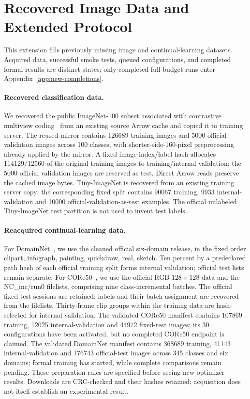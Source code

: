 \section{Recovered Image Data and Extended Protocol}
\label{app:recovered-images}
This extension fills previously missing image and continual-learning datasets. Acquired data, successful smoke tests, queued configurations, and completed formal results are distinct states; only completed full-budget runs enter Appendix~\ref{app:new-completions}.

\paragraph{Recovered classification data.}
We recovered the public ImageNet-100 subset associated with contrastive multiview coding~\cite{tian2020cmc} from an existing source Arrow cache and copied it to training server. The reused mirror contains 126689 training images and 5000 official validation images across 100 classes, with shorter-side-160-pixel preprocessing already applied by the mirror. A fixed image-index/label hash allocates 114129/12560 of the original training images to training/internal validation; the 5000 official validation images are reserved as test. Direct Arrow reads preserve the cached image bytes. Tiny-ImageNet is recovered from an existing training server copy: the corresponding fixed split contains 90067 training, 9933 internal-validation and 10000 official-validation-as-test examples. The official unlabeled Tiny-ImageNet test partition is not used to invent test labels.

\paragraph{Reacquired continual-learning data.}
For DomainNet~\cite{peng2019moment}, we use the cleaned official six-domain release, in the fixed order clipart, infograph, painting, quickdraw, real, sketch. Ten percent by a predeclared path hash of each official training split forms internal validation; official test lists remain separate. For CORe50~\cite{lomonaco2017core50}, we use the official RGB $128\times128$ data and the NC\_inc/run0 filelists, comprising nine class-incremental batches. The official fixed test sessions are retained; labels and their batch assignment are recovered from the filelists. Thirty-frame clip groups within the training data are hash-selected for internal validation. The validated CORe50 manifest contains 107869 training, 12025 internal-validation and 44972 fixed-test images; its 30 configurations have been activated, but no completed CORe50 endpoint is claimed. The validated DomainNet manifest contains 368689 training, 41143 internal-validation and 176743 official-test images across 345 classes and six domains; formal training has started, while complete comparisons remain pending. These preparation rules are specified before seeing new optimizer results. Downloads are CRC-checked and their hashes retained; acquisition does not itself establish an experimental result.


